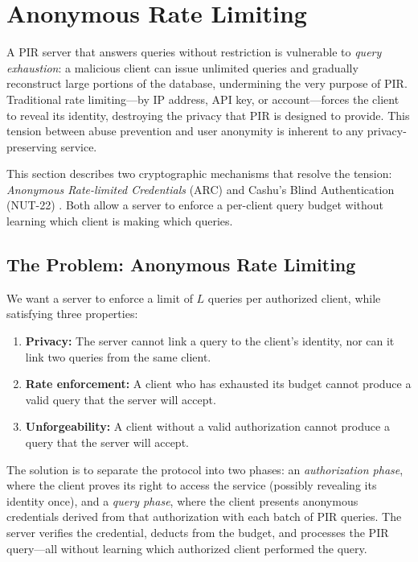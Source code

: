 \section{Anonymous Rate Limiting}
\label{sec:ratelimit}

A PIR server that answers queries without restriction is vulnerable to \emph{query exhaustion}: a malicious client can issue unlimited queries and gradually reconstruct large portions of the database, undermining the very purpose of PIR. Traditional rate limiting---by IP address, API key, or account---forces the client to reveal its identity, destroying the privacy that PIR is designed to provide. This tension between abuse prevention and user anonymity is inherent to any privacy-preserving service.

This section describes two cryptographic mechanisms that resolve the tension: \emph{Anonymous Rate-limited Credentials} (ARC) \cite{arc} and Cashu's Blind Authentication (NUT-22) \cite{cashu}. Both allow a server to enforce a per-client query budget without learning which client is making which queries.

\subsection{The Problem: Anonymous Rate Limiting}

We want a server to enforce a limit of $L$ queries per authorized client, while satisfying three properties:

\begin{enumerate}[nolistsep,leftmargin=*]
    \item \textbf{Privacy:} The server cannot link a query to the client's identity, nor can it link two queries from the same client.
    \item \textbf{Rate enforcement:} A client who has exhausted its budget cannot produce a valid query that the server will accept.
    \item \textbf{Unforgeability:} A client without a valid authorization cannot produce a query that the server will accept.
\end{enumerate}

The solution is to separate the protocol into two phases: an \emph{authorization phase}, where the client proves its right to access the service (possibly revealing its identity once), and a \emph{query phase}, where the client presents anonymous credentials derived from that authorization with each batch of PIR queries. The server verifies the credential, deducts from the budget, and processes the PIR query---all without learning which authorized client performed the query.

